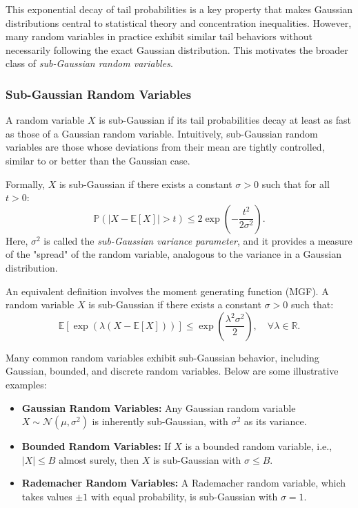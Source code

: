 This exponential decay of tail probabilities is a key property that makes Gaussian distributions central to statistical theory and concentration inequalities. However, many random variables in practice exhibit similar tail behaviors without necessarily following the exact Gaussian distribution. This motivates the broader class of \textit{sub-Gaussian random variables}.  

\subsubsection{Sub-Gaussian Random Variables}  
A random variable \( X \) is sub-Gaussian if its tail probabilities decay at least as fast as those of a Gaussian random variable. Intuitively, sub-Gaussian random variables are those whose deviations from their mean are tightly controlled, similar to or better than the Gaussian case.  

Formally, \( X \) is sub-Gaussian if there exists a constant \( \sigma > 0 \) such that for all \( t > 0 \):  
\[
\mathbb{P}(\vert X - \mathbb{E}[X] \vert > t) \leq 2 \exp\left(-\frac{t^2}{2\sigma^2}\right).
\]  
Here, \( \sigma^2 \) is called the \textit{sub-Gaussian variance parameter}, and it provides a measure of the "spread" of the random variable, analogous to the variance in a Gaussian distribution.  

An equivalent definition involves the moment generating function (MGF). A random variable \( X \) is sub-Gaussian if there exists a constant \( \sigma > 0 \) such that:  
\[
\mathbb{E}[\exp(\lambda(X - \mathbb{E}[X]))] \leq \exp\left(\frac{\lambda^2 \sigma^2}{2}\right), \quad \forall \lambda \in \mathbb{R}.
\]  

Many common random variables exhibit sub-Gaussian behavior, including Gaussian, bounded, and discrete random variables. Below are some illustrative examples:  
\begin{itemize}
    \item \textbf{Gaussian Random Variables:} Any Gaussian random variable \( X \sim \mathcal{N}(\mu, \sigma^2) \) is inherently sub-Gaussian, with \( \sigma^2 \) as its variance.  
    \item \textbf{Bounded Random Variables:} If \( X \) is a bounded random variable, i.e., \( \vert X \vert \leq B \) almost surely, then \( X \) is sub-Gaussian with \( \sigma \leq B \).  
    \item \textbf{Rademacher Random Variables:} A Rademacher random variable, which takes values \( \pm 1 \) with equal probability, is sub-Gaussian with \( \sigma = 1 \).  
\end{itemize}  


